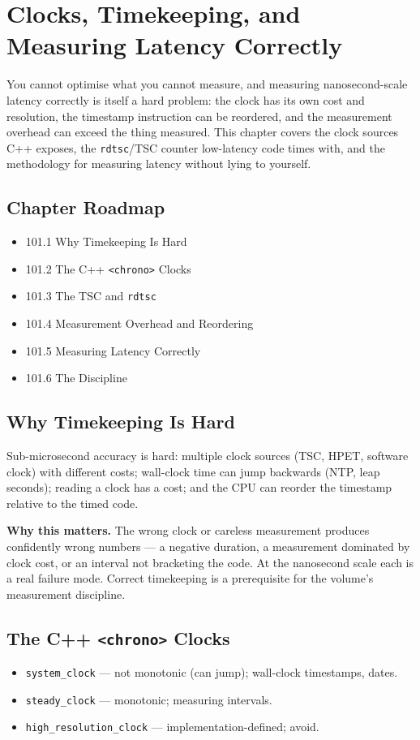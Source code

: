 \chapter{Clocks, Timekeeping, and Measuring Latency Correctly}

You cannot optimise what you cannot measure, and measuring nanosecond-scale latency correctly is itself a hard problem: the clock has its own cost and resolution, the timestamp instruction can be reordered, and the measurement overhead can exceed the thing measured. This chapter covers the clock sources C++ exposes, the \texttt{rdtsc}/TSC counter low-latency code times with, and the methodology for measuring latency without lying to yourself.

\section*{Chapter Roadmap}
\begin{itemize}
\item 101.1 Why Timekeeping Is Hard
\item 101.2 The C++ \texttt{<chrono>} Clocks
\item 101.3 The TSC and \texttt{rdtsc}
\item 101.4 Measurement Overhead and Reordering
\item 101.5 Measuring Latency Correctly
\item 101.6 The Discipline
\end{itemize}

\section{Why Timekeeping Is Hard}
Sub-microsecond accuracy is hard: multiple clock sources (TSC, HPET, software clock) with different costs; wall-clock time can jump backwards (NTP, leap seconds); reading a clock has a cost; and the CPU can reorder the timestamp relative to the timed code.

\textbf{Why this matters.} The wrong clock or careless measurement produces confidently wrong numbers --- a negative duration, a measurement dominated by clock cost, or an interval not bracketing the code. At the nanosecond scale each is a real failure mode. Correct timekeeping is a prerequisite for the volume's measurement discipline.

\section{The C++ \texttt{<chrono>} Clocks}
\begin{itemize}
\item \texttt{system\_clock} --- not monotonic (can jump); wall-clock timestamps, dates.
\item \texttt{steady\_clock} --- monotonic; measuring intervals.
\item \texttt{high\_resolution\_clock} --- implementation-defined; avoid.
\end{itemize}

